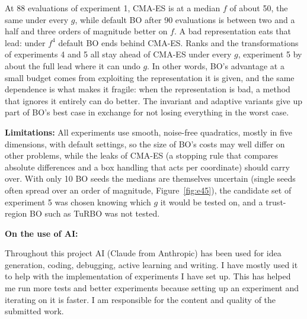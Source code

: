 \documentclass[12pt,a4paper]{article}
\begin{document}
At 88 evaluations of experiment 1, CMA-ES is at a median \(f\) of about 50, the same under every \(g\), while default BO after 90 evaluations is between two and a half and three orders of magnitude better on \(f\). A bad representation eats that lead: under \(f^{4}\) default BO ends behind CMA-ES. Ranks and the transformations of experiments 4 and 5 all stay ahead of CMA-ES under every \(g\), experiment 5 by about the full lead where it can undo \(g\). In other words, BO's advantage at a small budget comes from exploiting the representation it is given, and the same dependence is what makes it fragile: when the representation is bad, a method that ignores it entirely can do better. The invariant and adaptive variants give up part of BO's best case in exchange for not losing everything in the worst case.

\textbf{Limitations:} All experiments use smooth, noise-free quadratics, mostly in five dimensions, with default settings, so the size of BO's costs may well differ on other problems, while the leaks of CMA-ES (a stopping rule that compares absolute differences and a box handling that acts per coordinate) should carry over. With only 10 BO seeds the medians are themselves uncertain (single seeds often spread over an order of magnitude, Figure~\ref{fig:e45}), the candidate set of experiment 5 was chosen knowing which \(g\) it would be tested on, and a trust-region BO such as TuRBO \cite{eriksson2019} was not tested.

\textbf{On the use of AI:}

Throughout this project AI (Claude from Anthropic) has been used for idea generation, coding, debugging, active learning and writing. I have mostly used it to help with the implementation of experiments I have set up. This has helped me run more tests and better experiments because setting up an experiment and iterating on it is faster. I am responsible for the content and quality of the submitted work.

\nocite{frazier2018,hansen2016,eriksson2019,hansen2021coco}
{\footnotesize


}
\end{document}
